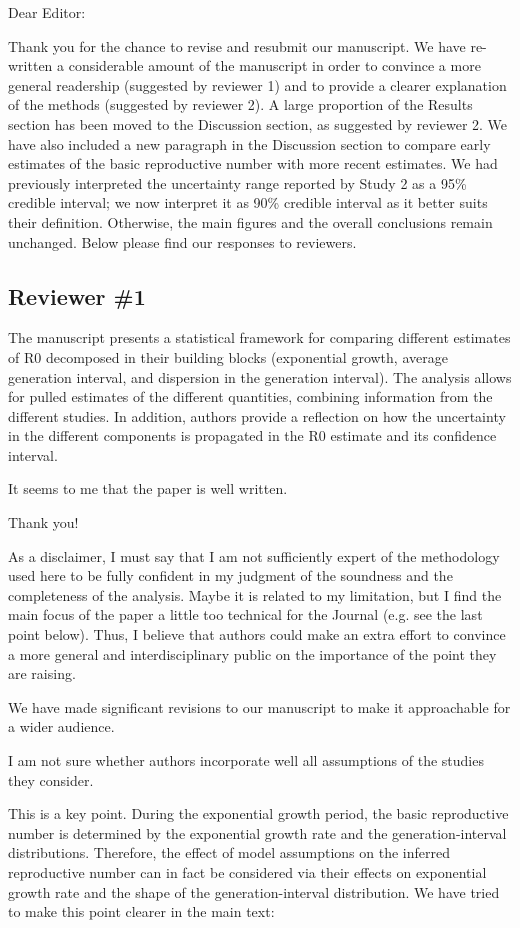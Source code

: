\documentclass[12pt]{article}
\newcommand{\rev}{\subsection*}
\newcommand{\revtext}{\textsf}
\begin{document}
\noindent Dear Editor:

Thank you for the chance to revise and resubmit our manuscript. 
We have re-written a considerable amount of the manuscript in order to convince a more general readership (suggested by reviewer 1) and to provide a clearer explanation of the methods (suggested by reviewer 2).
A large proportion of the Results section has been moved to the Discussion section, as suggested by reviewer 2.
We have also included a new paragraph in the Discussion section to compare early estimates  of the basic reproductive number with more recent estimates.
We had previously interpreted the uncertainty range reported by Study 2 as a 95\% credible interval; we now interpret it as 90\% credible interval as it better suits their definition.
Otherwise, the main figures and the overall conclusions remain unchanged.
Below please find our responses to reviewers.

\rev{Reviewer \#1}

\revtext{
The manuscript presents a statistical framework for comparing different estimates of R0 decomposed in their building blocks (exponential growth, average generation interval, and dispersion in the generation interval). The analysis allows for pulled estimates of the different quantities, combining information from the different studies. In addition, authors provide a reflection on how the uncertainty in the different components is propagated in the R0 estimate and its confidence interval.}

\revtext{It seems to me that the paper is well written.}

Thank you!

\revtext{As a disclaimer, I must say that I am not sufficiently expert of the methodology used here to be fully confident in my judgment of the soundness and the completeness of the analysis. Maybe it is related to my limitation, but I find the main focus of the paper a little too technical for the Journal (e.g. see the last point below). Thus, I believe that authors could make an extra effort to convince a more general and interdisciplinary public on the importance of the point they are raising.}

We have made significant revisions to our manuscript to make it approachable for a wider audience.

\revtext{I am not sure whether authors incorporate well all assumptions of the studies they consider.} 

This is a key point. During the exponential growth period, the basic reproductive number is determined by the exponential growth rate and the generation-interval distributions.
Therefore, the effect of model assumptions on the inferred reproductive number can in fact be considered via their effects on exponential growth rate and the shape of the generation-interval distribution.
We have tried to make this point clearer in the main text:
\end{document}
